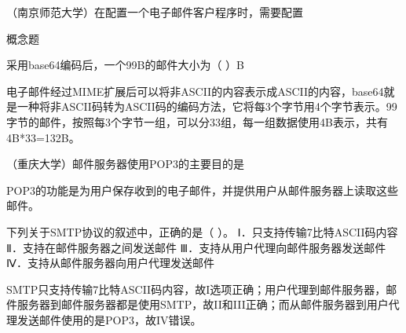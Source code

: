 \question （南京师范大学）在配置一个电子邮件客户程序时，需要配置
\par{}
\begin{solution}概念题
\end{solution}
\question 采用base64编码后，一个99B的邮件大小为（ ）B
\par{}
\begin{solution}电子邮件经过MIME扩展后可以将非ASCII的内容表示成ASCII的内容，base64就是一种将非ASCII码转为ASCII码的编码方法，它将每3个字节用4个字节表示。99字节的邮件，按照每3个字节一组，可以分33组，每一组数据使用4B表示，共有4B*33=132B。
\end{solution}
\question （重庆大学）邮件服务器使用POP3的主要目的是
\par{}
\begin{solution}POP3的功能是为用户保存收到的电子邮件，并提供用户从邮件服务器上读取这些邮件。
\end{solution}
\question 下列关于SMTP协议的叙述中，正确的是（ ）。 Ⅰ．只支持传输7比特ASCII码内容
Ⅱ．支持在邮件服务器之间发送邮件 Ⅲ．支持从用户代理向邮件服务器发送邮件
Ⅳ．支持从邮件服务器向用户代理发送邮件
\par{}
\begin{solution}SMTP只支持传输7比特ASCII码内容，故I选项正确；用户代理到邮件服务器，邮件服务器到邮件服务器都是使用SMTP，故II和III正确；而从邮件服务器到用户代理发送邮件使用的是POP3，故IV错误。
\end{solution}
